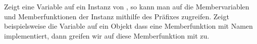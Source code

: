 Zeigt eine Variable  auf ein Instanz von , so kann man auf die Membervariablen und Memberfunktionen der Instanz mithilfe des Präfixes  zugreifen.
Zeigt beispielsweise die Variable  auf ein Objekt dass eine Memberfunktion mit Namen  implementiert,
dann greifen wir auf diese Memberfunktion mit  zu.
